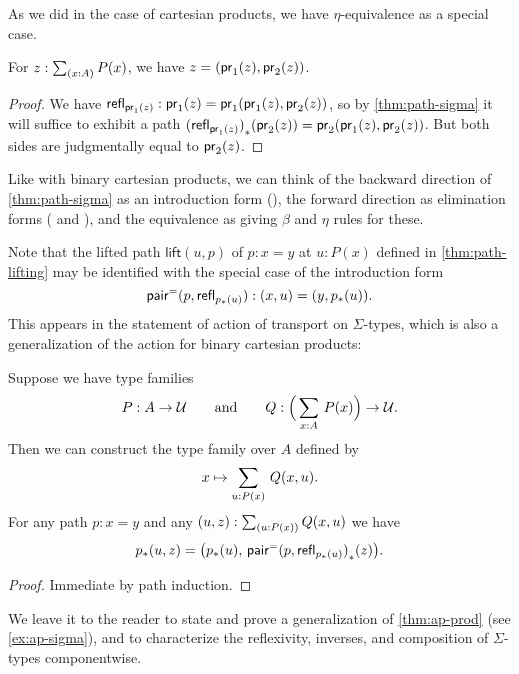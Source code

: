 As we did in the case of cartesian products, we have $\eta$-equivalence as a special case.

\begin{cor}\label{thm:eta-sigma}
  For $z:\sm{x:A} P(x)$, we have $z = (\mathsf{pr}_{1}(z),\mathsf{pr}_{2}(z))$.
\end{cor}
\begin{proof}
  We have $\mathsf{refl}_{\mathsf{pr}_{1}(z)} : \mathsf{pr}_{1}(z) = \mathsf{pr}_{1}(\mathsf{pr}_{1}(z),\mathsf{pr}_{2}(z))$, so by \autoref{thm:path-sigma} it will suffice to exhibit a path ${(\mathsf{refl}_{\mathsf{pr}_{1}(z)})}_{*}\mathopen{}\left({\mathsf{pr}_{2}(z)}\right)\mathclose{} = \mathsf{pr}_{2}(\mathsf{pr}_{1}(z),\mathsf{pr}_{2}(z))$.
  But both sides are judgmentally equal to $\mathsf{pr}_{2}(z)$.
\end{proof}

Like with binary cartesian products, we can think of 
the backward direction of \autoref{thm:path-sigma} as
an introduction form (\pairpath{}{}), the forward direction as
elimination forms ( and ), and the equivalence
as giving $\beta$ and $\eta$ rules for these.  

Note that the lifted path $\mathsf{lift}(u,p)$  of $p:x=y$ at $u:P(x)$ defined in \autoref{thm:path-lifting} may be identified with the special case of the introduction form
\[\mathsf{pair}^{\mathord{=}}(p,\mathsf{refl}_{{p}_{*}\mathopen{}\left({u}\right)\mathclose{}}):(x,u) = (y,{p}_{*}\mathopen{}\left({u}\right)\mathclose{}).\]
This appears in the statement of action of transport on $\Sigma$-types, which is also a generalization of the action for binary cartesian products:

\begin{thm}\label{transport-Sigma}
  Suppose we have type families
  \begin{equation*}
    P:A\to\type
    \qquad\text{and}\qquad
    Q:\Big(\sm{x:A} P(x)\Big)\to\type.
  \end{equation*}
  Then we can construct the type family over $A$ defined by
  \begin{equation*}
    x \mapsto \sm{u:P(x)} Q(x,u).
  \end{equation*}
  For any path $p:x=y$ and any $(u,z):\sm{u:P(x)} Q(x,u)$ we have
  \begin{equation*}
    {p}_{*}\mathopen{}\left({u,z}\right)\mathclose{}=\big({p}_{*}\mathopen{}\left({u}\right)\mathclose{},\,{\mathsf{pair}^{\mathord{=}}(p,\mathsf{refl}_{{p}_{*}\mathopen{}\left({u}\right)\mathclose{}})}_{*}\mathopen{}\left({z}\right)\mathclose{}\big).
  \end{equation*}
\end{thm}

\begin{proof}
Immediate by path induction.
\end{proof}

We leave it to the reader to state and prove a generalization of
\autoref{thm:ap-prod} (see \autoref{ex:ap-sigma}), and to characterize
the reflexivity, inverses, and composition of $\Sigma$-types
componentwise.


